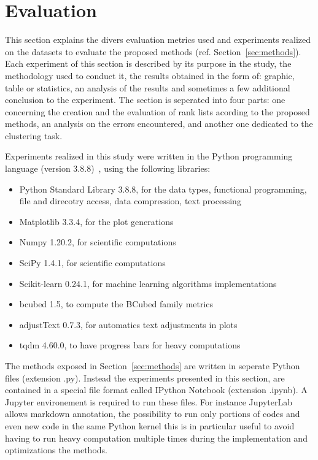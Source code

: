 \section{Evaluation \label{sec:evaluation}}

This section explains the divers evaluation metrics used and experiments realized on the datasets to evaluate the proposed methods (ref. Section~\ref{sec:methods}).
Each experiment of this section is described by its purpose in the study, the methodology used to conduct it, the results obtained in the form of: graphic, table or statistics, an analysis of the results and sometimes a few additional conclusion to the experiment.
The section is seperated into four parts: one concerning the creation and the evaluation of rank lists acording to the proposed methods, an analysis on the errors encountered, and another one dedicated to the clustering task.

Experiments realized in this study were written in the Python programming language (version 3.8.8)~\cite{python}, using the following libraries:
\begin{itemize}
  \item Python Standard Library 3.8.8, for the data types, functional programming, file and direcotry access, data compression, text processing~\cite{python_standard_library}
  \item Matplotlib 3.3.4, for the plot generations~\cite{matplotlib}
  \item Numpy 1.20.2, for scientific computations~\cite{numpy}
  \item SciPy 1.4.1, for scientific computations~\cite{scipy}
  \item Scikit-learn 0.24.1, for machine learning algorithms implementations~\cite{sklearn}
  \item bcubed 1.5, to compute the BCubed family metrics~\cite{bcubed_gh}
  \item adjustText 0.7.3, for automatics text adjustments in plots~\cite{adjustText}
  \item tqdm 4.60.0, to have progress bars for heavy computations~\cite{tqdm}
\end{itemize}
The methods exposed in Section~\ref{sec:methods} are written in seperate Python files (extension .py).
Instead the experiments presented in this section, are contained in a special file format called IPython Notebook (extension .ipynb).
A Jupyter environement is required to run these files.
For instance JupyterLab allows markdown annotation, the possibility to run only portions of codes and even new code in the same Python kernel this is in particular useful to avoid having to run heavy computation multiple times during the implementation and optimizations the methods.







